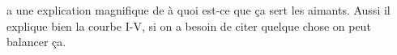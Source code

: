 
\cite{merlino_understanding_2007} a une explication magnifique de à quoi est-ce que ça sert les aimants.
Aussi il explique bien la courbe I-V, si on a besoin de citer quelque chose on peut balancer ça.